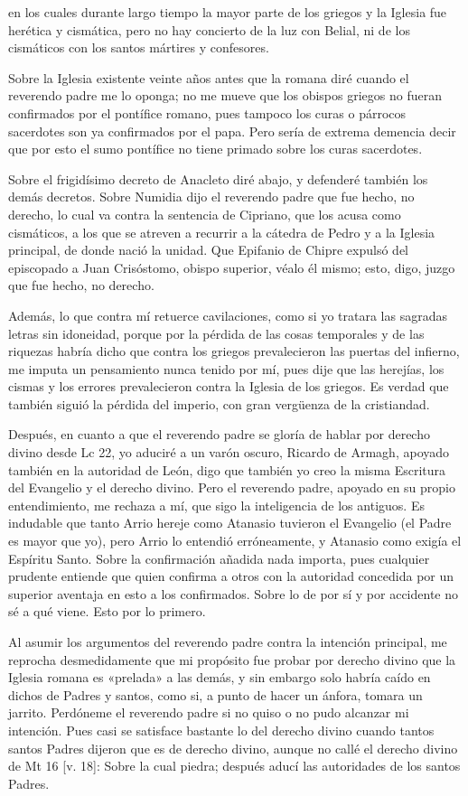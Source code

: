 en \marginpar{\small[281]} los cuales durante largo tiempo la mayor parte de los griegos y la Iglesia fue herética y cismática, pero no hay concierto de la luz con Belial, ni de los cismáticos con los santos mártires y confesores.

Sobre la Iglesia existente veinte años antes que la romana diré cuando el reverendo padre me lo oponga; no me mueve que los obispos griegos no fueran confirmados por el pontífice romano, pues tampoco los curas o párrocos sacerdotes son ya confirmados por el papa. Pero sería de extrema demencia decir que por esto el sumo pontífice no tiene primado sobre los curas sacerdotes.

Sobre el frigidísimo decreto de Anacleto diré abajo, y defenderé también los demás decretos. Sobre Numidia dijo el reverendo padre que fue hecho, no derecho, lo cual va contra la sentencia de Cipriano, que los acusa como cismáticos, a los que se atreven a recurrir a la cátedra de Pedro y a la Iglesia principal, de donde nació la unidad. Que Epifanio de Chipre expulsó del episcopado a Juan Crisóstomo, obispo superior, véalo él mismo; esto, digo, juzgo que fue hecho, no derecho.

Además, lo que contra mí retuerce cavilaciones, como si yo tratara las sagradas letras sin idoneidad, porque por la pérdida de las cosas temporales y de las riquezas habría dicho que contra los griegos prevalecieron las puertas del infierno, me imputa un pensamiento nunca tenido por mí, pues dije que las herejías, los cismas y los errores prevalecieron contra la Iglesia de los griegos. Es verdad que también siguió la pérdida del imperio, con gran vergüenza de la cristiandad.

Después, en cuanto a que el reverendo padre se gloría de hablar por derecho divino desde Lc 22, yo aduciré a un varón oscuro, Ricardo de Armagh, apoyado también en la autoridad de León, digo que también yo creo la misma Escritura del Evangelio y el derecho divino. Pero el reverendo padre, apoyado en su propio entendimiento, me rechaza a mí, que sigo la inteligencia de los antiguos. Es indudable que tanto Arrio hereje como Atanasio tuvieron el Evangelio (el Padre es mayor que yo), pero Arrio lo entendió erróneamente, y Atanasio como exigía el Espíritu Santo. Sobre la confirmación añadida nada importa, pues cualquier prudente entiende que quien confirma a otros con la autoridad concedida por un superior aventaja en esto a los confirmados. Sobre lo de por sí y por accidente no sé a qué viene. Esto por lo primero.

Al asumir los argumentos del reverendo padre contra la intención principal, me reprocha desmedidamente que mi propósito fue probar por derecho divino que la Iglesia romana es «prelada» a las demás, y sin embargo solo habría caído en dichos de Padres y santos, como si, a punto de hacer un ánfora, tomara un jarrito. Perdóneme el reverendo padre si no quiso o no pudo alcanzar mi intención. Pues casi se satisface bastante lo del derecho divino cuando tantos santos Padres dijeron que es de derecho divino, aunque no callé el derecho divino de Mt 16 [v. 18]: Sobre la cual piedra; después aducí las autoridades de los santos Padres.


